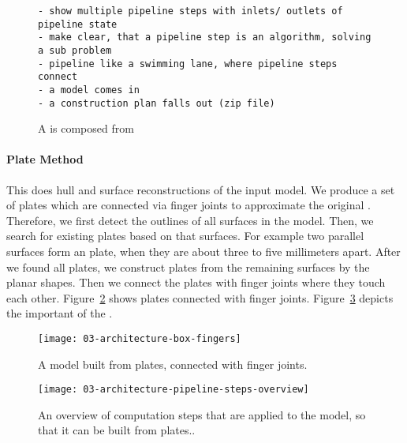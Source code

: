 \documentclass[../ClassicThesis.tex]{subfiles}
\begin{document}
\begin{figure}[h]
\centering
\begin{verbatim}
- show multiple pipeline steps with inlets/ outlets of
pipeline state
- make clear, that a pipeline step is an algorithm, solving
a sub problem
- pipeline like a swimming lane, where pipeline steps
connect
- a model comes in
- a construction plan falls out (zip file)
\end{verbatim}
\caption{A  is composed from
  }
\label{fig:pipeline-from-steps}
\end{figure}

\paragraph{Plate Method}

This \class{\fabmethod} does hull and surface
reconstructions of the input model. We produce a set of
plates which are connected via finger joints to approximate
the original {\threedmodel}. Therefore, we first detect the
outlines of all surfaces in the model. Then, we search for
existing plates based on that surfaces. For example two
parallel surfaces form an  plate, when they
are about three to five millimeters apart. After we found
all  plates, we construct plates from the
remaining surfaces by  the planar shapes.
Then we connect the plates with finger joints where they
touch each other. Figure~\ref{fig:model-fingers} shows
plates connected with finger joints.
Figure~\ref{fig:overview-plate-steps} depicts the important
 of the .

\begin{figure}[h]
  \centering
  \texttt{[image: 03-architecture-box-fingers]}
  \caption{A model built from plates, connected with finger
    joints.}
  \label{fig:model-fingers}
\end{figure}

\begin{figure}[h]
  \centering
  \texttt{[image: 03-architecture-pipeline-steps-overview]}
  \caption{An overview of computation steps that are applied
    to the model, so that it can be built from plates..}
  \label{fig:overview-plate-steps}
\end{figure}


\end{document}
